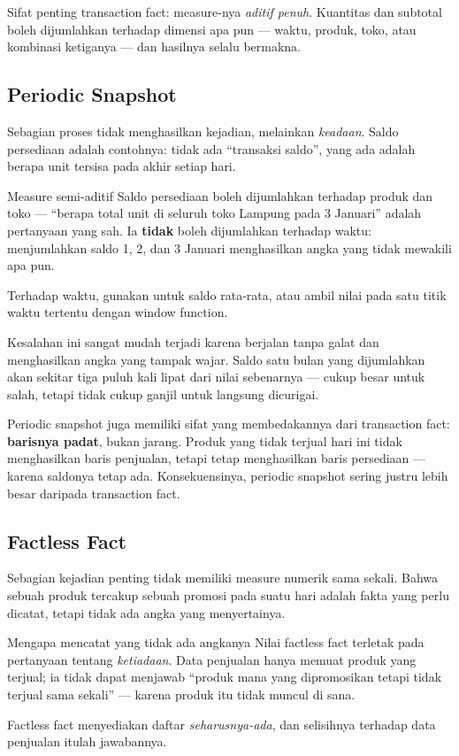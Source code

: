 Sifat penting transaction fact: measure-nya \emph{aditif penuh}. Kuantitas dan
subtotal boleh dijumlahkan terhadap dimensi apa pun --- waktu, produk, toko,
atau kombinasi ketiganya --- dan hasilnya selalu bermakna.

\subsection{Periodic Snapshot}

Sebagian proses tidak menghasilkan kejadian, melainkan \emph{keadaan}. Saldo
persediaan adalah contohnya: tidak ada ``transaksi saldo'', yang ada adalah
berapa unit tersisa pada akhir setiap hari.

\begin{konsep}{Measure semi-aditif}
Saldo persediaan boleh dijumlahkan terhadap produk dan toko --- ``berapa total
unit di seluruh toko Lampung pada 3 Januari'' adalah pertanyaan yang sah.
Ia \textbf{tidak} boleh dijumlahkan terhadap waktu: menjumlahkan saldo 1, 2,
dan 3 Januari menghasilkan angka yang tidak mewakili apa pun.

Terhadap waktu, gunakan  untuk saldo rata-rata, atau ambil nilai
pada satu titik waktu tertentu dengan window function.
\end{konsep}

Kesalahan ini sangat mudah terjadi karena  berjalan tanpa galat
dan menghasilkan angka yang tampak wajar. Saldo satu bulan yang dijumlahkan
akan sekitar tiga puluh kali lipat dari nilai sebenarnya --- cukup besar untuk
salah, tetapi tidak cukup ganjil untuk langsung dicurigai.

Periodic snapshot juga memiliki sifat yang membedakannya dari transaction fact:
\textbf{barisnya padat}, bukan jarang. Produk yang tidak terjual hari ini tidak
menghasilkan baris penjualan, tetapi tetap menghasilkan baris persediaan ---
karena saldonya tetap ada. Konsekuensinya, periodic snapshot sering justru
lebih besar daripada transaction fact.

\subsection{Factless Fact}

Sebagian kejadian penting tidak memiliki measure numerik sama sekali. Bahwa
sebuah produk tercakup sebuah promosi pada suatu hari adalah fakta yang perlu
dicatat, tetapi tidak ada angka yang menyertainya.

\begin{konsep}{Mengapa mencatat yang tidak ada angkanya}
Nilai factless fact terletak pada pertanyaan tentang \emph{ketiadaan}. Data
penjualan hanya memuat produk yang terjual; ia tidak dapat menjawab
``produk mana yang dipromosikan tetapi tidak terjual sama sekali'' --- karena
produk itu tidak muncul di sana.

Factless fact menyediakan daftar \emph{seharusnya-ada}, dan selisihnya terhadap
data penjualan itulah jawabannya.
\end{konsep}

